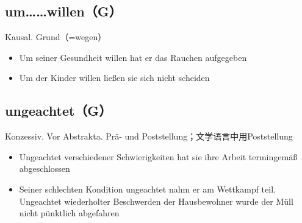 \documentclass[UTF8]{report}
\begin{document}
\subsection{um……willen（G）}
Kausal. Grund（=wegen）
\begin{itemize}
    \item Um seiner Gesundheit willen hat er das Rauchen aufgegeben
    \item Um der Kinder willen ließen sie sich nicht scheiden
\end{itemize}

\subsection{ungeachtet（G）}
Konzessiv. Vor Abstrakta. Prä- und Poststellung；文学语言中用Poststellung
\begin{itemize}
    \item Ungeachtet verschiedener Schwierigkeiten hat sie ihre Arbeit termingemäß abgeschlossen
    \item Seiner schlechten Kondition ungeachtet nahm er am Wettkampf teil. Ungeachtet wiederholter Beschwerden der Hausbewohner wurde der Müll nicht pünktlich abgefahren
\end{itemize}
\end{document}
